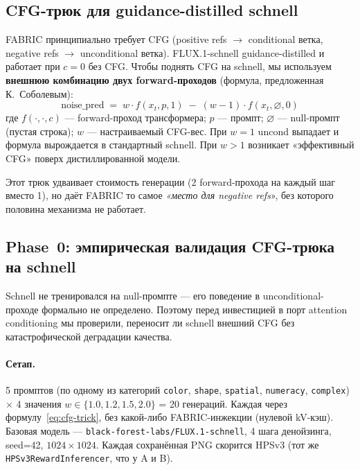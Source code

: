 \documentclass[11pt,a4paper]{article}
\begin{document}
\subsection{CFG-трюк для guidance-distilled schnell}

FABRIC принципиально требует CFG (positive refs $\to$ conditional ветка,
negative refs $\to$ unconditional ветка). FLUX.1-schnell guidance-distilled
и работает при $c=0$ без CFG. Чтобы поднять CFG на schnell, мы используем
\textbf{внешнюю комбинацию двух forward-проходов} (формула, предложенная
К.~Соболевым):
\begin{equation}
\boxed{
\;\text{noise\_pred} \;=\; w \cdot f(x_t, p, 1) \;-\; (w-1) \cdot f(x_t, \varnothing, 0)\;
}
\label{eq:cfg-trick}
\end{equation}
где $f(\cdot, \cdot, c)$ --- forward-проход трансформера; $p$ --- промпт;
$\varnothing$ --- null-промпт (пустая строка); $w$ --- настраиваемый CFG-вес.
При $w=1$ uncond выпадает и формула вырождается в стандартный schnell.
При $w>1$ возникает «эффективный CFG» поверх дистиллированной модели.

Этот трюк удваивает стоимость генерации (2 forward-прохода на каждый шаг
вместо 1), но даёт FABRIC то самое \emph{«место для negative refs}», без
которого половина механизма не работает.

\subsection{Phase~0: эмпирическая валидация CFG-трюка на schnell}

Schnell не тренировался на null-промпте --- его поведение в
unconditional-проходе формально не определено. Поэтому перед инвестицией в
порт attention conditioning мы проверили, переносит ли schnell внешний CFG
без катастрофической деградации качества.

\paragraph{Сетап.} 5 промптов (по одному из категорий
\texttt{color}, \texttt{shape}, \texttt{spatial}, \texttt{numeracy},
\texttt{complex}) $\times$ 4 значения $w \in \{1.0, 1.2, 1.5, 2.0\}$ =
20 генераций. Каждая через формулу~\eqref{eq:cfg-trick}, без какой-либо
FABRIC-инжекции (нулевой kV-кэш). Базовая модель ---
\texttt{black-forest-labs/FLUX.1-schnell}, 4 шага денойзинга, seed=42,
$1024 \times 1024$. Каждая сохранённая PNG скорится HPSv3 (тот же
\texttt{HPSv3RewardInferencer}, что у A и B).
\end{document}
